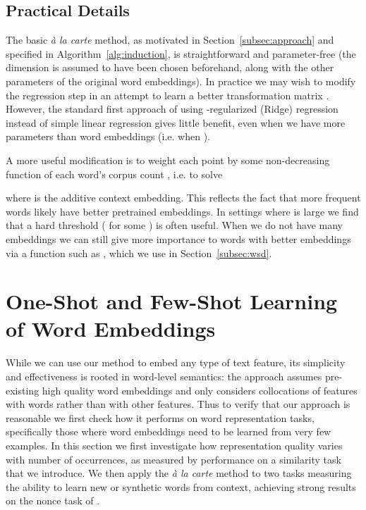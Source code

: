\documentclass[11pt,a4paper]{article}
\begin{document}
\subsection{Practical Details}\label{subsec:details}

The basic {\em\`a la carte} method, as motivated in Section~\ref{subsec:approach} and specified in Algorithm~\ref{alg:induction}, is straightforward and parameter-free (the dimension  is assumed to have been chosen beforehand, along with the other parameters of the original word embeddings).
In practice we may wish to modify the regression step in an attempt to learn a better transformation matrix .
However, the standard first approach of using -regularized (Ridge) regression instead of simple linear regression gives little benefit, even when we have more parameters than word embeddings (i.e. when ).

A more useful modification is to weight each point by some non-decreasing function  of each word's corpus count , i.e. to solve

where  is the additive context embedding.
This reflects the fact that more frequent words likely have better pretrained embeddings.
In settings where  is large we find that a hard threshold ( for some ) is often useful.
When we do not have many embeddings we can still give more importance to words with better embeddings via a function such as , which we use in Section~\ref{subsec:wsd}. 


\section{One-Shot and Few-Shot Learning of Word Embeddings}\label{sec:fewshot}

While we can use our method to embed any type of text feature, its simplicity and effectiveness is rooted in word-level semantics: the approach assumes pre-existing high quality word embeddings and only considers collocations of features with words rather than with other features.
Thus to verify that our approach is reasonable we first check how it performs on word representation tasks, specifically those where word embeddings need to be learned from very few examples.
In this section we first investigate how representation quality varies with number of occurrences, as measured by performance on a similarity task that we introduce.
We then apply the {\em\`a la carte} method to two tasks measuring the ability to learn new or synthetic words from context, achieving strong results on the nonce task of \citet{Herbelot:17}.
\end{document}
